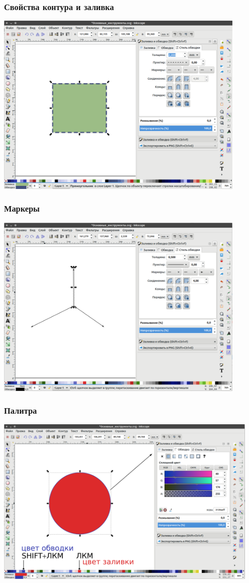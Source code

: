 \documentclass[12pt, compress]{beamer}
\begin{document}
\begin{frame}
\frametitle{Свойства контура и заливка }
\centering
\includegraphics[width=0.9\textwidth]{контур.png}
\end{frame}

\begin{frame}
\frametitle{Маркеры}
\centering
\includegraphics[width=0.9\textwidth]{контур-стрелка.png}
\end{frame}

\begin{frame}
\frametitle{Палитра}
\centering
\includegraphics[width=0.95\textwidth]{палитра.png}
\end{frame}
\end{document}
